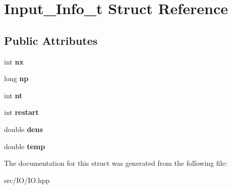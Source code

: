 \hypertarget{struct_input___info__t}{}\section{Input\+\_\+\+Info\+\_\+t Struct Reference}
\label{struct_input___info__t}
\subsection*{Public Attributes}
\begin{DoxyCompactItemize}
\item 
\hypertarget{struct_input___info__t_a5feb8e378b6fbd9381ed57ef740442c9}{}\label{struct_input___info__t_a5feb8e378b6fbd9381ed57ef740442c9} 
int {\bfseries nx}
\item 
\hypertarget{struct_input___info__t_a3acc90c9a977cd1c634b574df77e0f60}{}\label{struct_input___info__t_a3acc90c9a977cd1c634b574df77e0f60} 
long {\bfseries np}
\item 
\hypertarget{struct_input___info__t_aaa9358b4befa5b3d1e49ad5e01e1479a}{}\label{struct_input___info__t_aaa9358b4befa5b3d1e49ad5e01e1479a} 
int {\bfseries nt}
\item 
\hypertarget{struct_input___info__t_a455e1f52527a77caf01262001159bc24}{}\label{struct_input___info__t_a455e1f52527a77caf01262001159bc24} 
int {\bfseries restart}
\item 
\hypertarget{struct_input___info__t_ab546d417babbd8d41c67a68d46100a91}{}\label{struct_input___info__t_ab546d417babbd8d41c67a68d46100a91} 
double {\bfseries dens}
\item 
\hypertarget{struct_input___info__t_ab3e5d89692bbc8eb2b14a22cad1e790a}{}\label{struct_input___info__t_ab3e5d89692bbc8eb2b14a22cad1e790a} 
double {\bfseries temp}
\end{DoxyCompactItemize}


The documentation for this struct was generated from the following file\+:\begin{DoxyCompactItemize}
\item 
src/\+I\+O/I\+O.\+hpp\end{DoxyCompactItemize}
